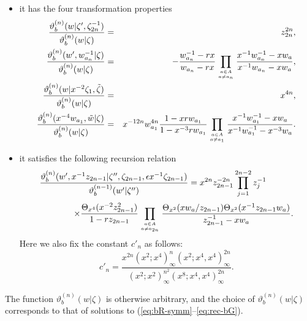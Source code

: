 \documentclass[a4paper,10pt]{article}
\begin{document}
{\begin{itemize}
\item
it has the four transformation properties 
\begin{eqnarray}
\displaystyle\frac
{\vartheta^{(n)}_b (w |\zeta', \zeta^{-1}_{2n})}
{\vartheta^{(n)}_b (w | \zeta )}&=& z_{2n}^{2n}, 
\label{eq:z^-1}\\
\displaystyle \frac
{\vartheta^{(n)}_b (w', w^{-1}_{a_n}| \zeta )}
{\vartheta^{(n)}_b (w | \zeta )}
&=& -\dfrac{w_{a_n}^{-1}-rx}{w_{a_n}-rx}
\displaystyle\prod_{a\in A\atop a\neq a_n} 
\frac{x^{-1}w_{a_n}^{-1}-xw_a}{x^{-1}w_{a_n}-xw_a}, 
\label{eq:w^-1} \\
\displaystyle\frac
{\vartheta^{(n)}_b (w |x^{-2}\zeta_1,\tilde{\zeta})}
{\vartheta^{(n)}_b (w | \zeta )}&=& x^{4n}, 
\label{eq:bz-sym}\\
\displaystyle \frac
{\vartheta^{(n)}_b (x^{-4}w_{a_1},\tilde{w}| \zeta )}
{\vartheta^{(n)}_b (w | \zeta )}
&=& x^{-12n}w_{a_1}^{4n} 
\dfrac{1-xrw_{a_1}}{1-x^{-3}rw_{a_1}} 
\displaystyle\prod_{a\in A\atop a\neq a_1} 
\frac{x^{-1}w_{a_1}^{-1} -xw_a}
{x^{-1}w_{a_1}^{-1} -x^{-3}w_a}. 
\label{eq:bx-sym}
\end{eqnarray}
\item it satisfies the following recursion relation
\begin{equation}
\begin{array}{l}
\displaystyle \frac{\vartheta_{b}^{(n)}
(w', x^{-1}z_{2n-1} |\zeta'',\zeta_{2n-1}, 
\epsilon x^{-1} \zeta_{2n-1})}
{\vartheta_{b}^{(n-1)}(w' |\zeta'')}=
\displaystyle x^{2n}z_{2n-1}^{-2n}\prod_{j=1}^{2n-2} 
z_j^{-1} 
\\[6mm] 
\qquad\qquad\times
\dfrac{\Theta_{x^4}(x^{-2}z_{2n-1}^2)}{1-rz_{2n-1}} 
\displaystyle\prod_{a\in A\atop a\neq a_{2n}} 
\frac{\Theta_{x^2}(x w_{a}/z_{2n-1})
\Theta_{x^2}(x^{-1}z_{2n-1}w_{a})}{z_{2n-1}^{-1}-xw_a}. 
\end{array}
\label{eq:bth-rec}
\end{equation}
Here we also fix the constant $c'_n$ as follows: 
\begin{equation}
c'_n =\frac{x^{2n}(x^2 ; x^4 )_\infty^{n}
(x^2 ; x^4 , x^4 )_\infty^{2n}}{
(x^2 ; x^2 )_\infty^{n^2}
(x^8 ; x^4 , x^4 )_\infty^{2n}}. 
\label{eq:c'_n}
\end{equation}
\end{itemize}
The function $\vartheta_{b}^{(n)}(w|\zeta )$
is otherwise arbitrary, and the choice of 
$\vartheta_{b}^{(n)}(w|\zeta )$ 
corresponds to that of solutions to 
(\ref{eq:bR-symm}--\ref{eq:rec-bG}). 

}
\end{document}
